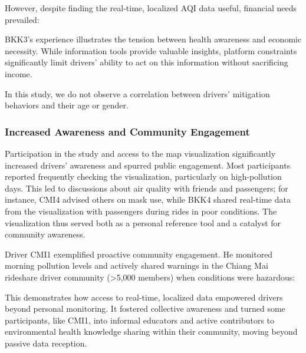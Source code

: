 However, despite finding the real-time, localized AQI data useful, financial needs prevailed:

\qpadding
{}
\qpadding

BKK3's experience illustrates the tension between health awareness and economic necessity.
While information tools provide valuable insights, platform constraints significantly limit drivers' ability to act on this information without sacrificing income.

In this study, we do not observe a correlation between drivers' mitigation behaviors and their age or gender.

\subsubsection{Increased Awareness and Community Engagement}
Participation in the study and access to the map visualization significantly increased drivers' awareness and spurred public engagement.
Most participants reported frequently checking the visualization, particularly on high-pollution days.
This led to discussions about air quality with friends and passengers; for instance, CMI4 advised others on mask use, while BKK4 shared real-time data from the visualization with passengers during rides in poor conditions.
The visualization thus served both as a personal reference tool and a catalyst for community awareness.

Driver CMI1 exemplified proactive community engagement.
He monitored morning pollution levels and actively shared warnings in the Chiang Mai rideshare driver community (>5,000 members) when conditions were hazardous:

\qpadding
{}
\qpadding

This demonstrates how access to real-time, localized data empowered drivers beyond personal monitoring.
It fostered collective awareness and turned some participants, like CMI1, into informal educators and active contributors to environmental health knowledge sharing within their community, moving beyond passive data reception.

